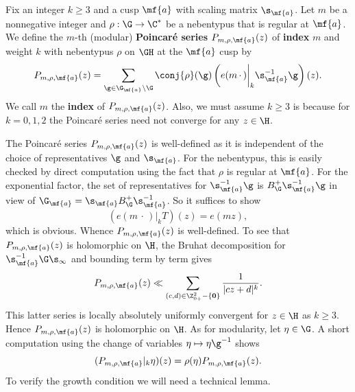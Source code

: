 \documentclass[12pt]{article}
\begin{document}
      Fix an integer \(k \ge 3\) and a cusp \(\mf{a}\) with scaling matrix \(\s_{\mf{a}}\). Let \(m\) be a nonnegative integer and \(\rho:\G \to \C^{\ast}\) be a nebentypus that is regular at \(\mf{a}\). We define the \(m\)-th (modular) \textbf{Poincar\'e series} \(P_{m,\rho,\mf{a}}(z)\) of \textbf{index} \(m\) and weight \(k\) with nebentypus \(\rho\) on \(\GH\) at the \(\mf{a}\) cusp by
      \[
        P_{m,\rho,\mf{a}}(z) = \sum_{\g \in \G_{\mf{a}}\backslash\G}\conj{\rho}(\g)\left(e(m\,\cdot\,)\bigg|_{k}\s_{\mf{a}}^{-1}\g\right)(z).
      \]
      We call \(m\) the \textbf{index} of \(P_{m,\rho,\mf{a}}(z)\). Also, we must assume \(k \ge 3\) is because for \(k = 0,1,2\) the Poincar\'e series need not converge for any \(z \in \H\).

      The Poincar\'e series \(P_{m,\rho,\mf{a}}(z)\) is well-defined as it is independent of the choice of representatives \(\g\) and \(\s_{\mf{a}}\). For the nebentypus, this is easily checked by direct computation using the fact that \(\rho\) is regular at \(\mf{a}\). For the exponential factor, the set of representatives for \(\s_{\mf{a}}^{-1}\g\) is \(B_{\G}^{+}\s_{\mf{a}}^{-1}\g\) in view of \(\G_{\mf{a}} = \s_{\mf{a}}B_{\G}^{+}\s_{\mf{a}}^{-1}\). So it suffices to show 
      \[
        \left(e(m\,\cdot\,)\bigg|_{k}T\right)(z) = e(mz),
      \]
      which is obvious. Whence \(P_{m,\rho,\mf{a}}(z)\) is well-defined. To see that \(P_{m,\rho,\mf{a}}(z)\) is holomorphic on \(\H\), the Bruhat decomposition for \(\s_{\mf{a}}^{-1}\G\s_{\infty}\) and bounding term by term gives
      \[
        P_{m,\rho,\mf{a}}(z) \ll \sum_{(c,d) \in \Z_{0+}^{2}-\{\mathbf{0}\}}\frac{1}{|cz+d|^{k}}.
      \]
      This latter series is locally absolutely uniformly convergent for \(z \in \H\) as \(k \ge 3\). Hence \(P_{m,\rho,\mf{a}}(z)\) is holomorphic on \(\H\). As for modularity, let \(\eta \in \G\). A short computation using the change of variables \(\eta \mapsto \eta\g^{-1}\) shows
      \[
        (P_{m,\rho,\mf{a}}|_{k}\eta)(z) = \rho(\eta)P_{m,\rho,\mf{a}}(z).
      \]
      To verify the growth condition we will need a technical lemma.
\end{document}
